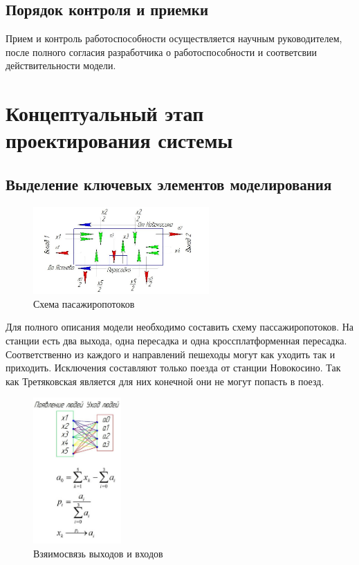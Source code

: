 \documentclass[12pt]{article}
\begin{document}
	\subsection{Порядок контроля и приемки}
	Прием и контроль работоспособности осуществляется научным руководителем, после полного согласия разработчика о работоспособности и соответсвии действительности модели. 

\newpage

\section{Концептуальный этап проектирования системы}
		\subsection{Выделение ключевых элементов моделирования}
 \begin{figure}
  	\begin{center}
  	  	\includegraphics[width=0.6\textwidth]{shema.jpg}
 	 \end{center}
	  	\caption{Схема пасажиропотоков}
\end{figure}	


		Для полного описания модели необходимо составить схему пассажиропотоков. На станции есть два выхода, одна пересадка и одна кроссплатформенная пересадка. Соответственно из каждого и направлений пешеходы могут как уходить так и приходить.  Исключения составляют только поезда от станции Новокосино. Так как Третяковская является для них конечной они не могут попасть в поезд.
 \begin{figure}
  	\begin{center}
  	  	\includegraphics[width=0.3\textwidth]{enter_exit.jpg}
 	 \end{center}
	  	\caption{Взяимосвязь выходов и  входов}
\end{figure}
  
\end{document}
